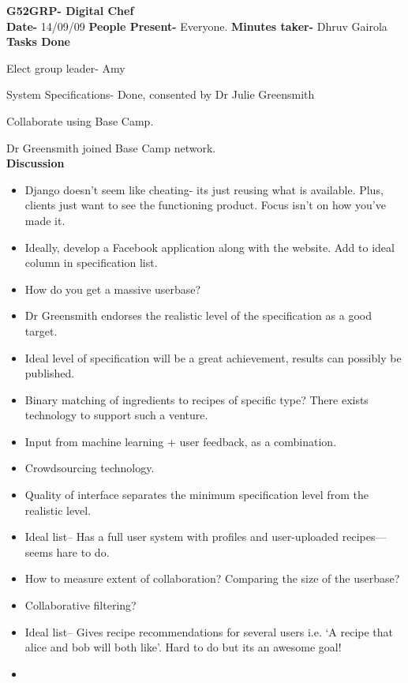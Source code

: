 \textbf{G52GRP- Digital Chef} \\

\textbf{Date-} 14/09/09 \textbf{People Present-} Everyone.
\textbf{Minutes taker-} Dhruv Gairola \\

\textbf{Tasks Done}

Elect group leader- Amy

System Specifications- Done, consented by Dr Julie Greensmith

Collaborate using Base Camp.

Dr Greensmith joined Base Camp network. \\

\textbf{Discussion}

\begin{itemize}
\item
  Django doesn’t seem like cheating- its just reusing what is
  available. Plus, clients just want to see the functioning product.
  Focus isn’t on how you’ve made it.
\item
  Ideally, develop a Facebook application along with the website. Add
  to ideal column in specification list.
\item
  How do you get a massive userbase?
\item
  Dr Greensmith endorses the realistic level of the specification as
  a good target.
\item
  Ideal level of specification will be a great achievement, results
  can possibly be published.
\item
  Binary matching of ingredients to recipes of specific type? There
  exists technology to support such a venture.
\item
  Input from machine learning + user feedback, as a combination.
\item
  Crowdsourcing technology.
\item
  Quality of interface separates the minimum specification level from
  the realistic level.
\item
  Ideal list-- Has a full user system with profiles and user-uploaded
  recipes—seems hare to do.
\item
  How to measure extent of collaboration? Comparing the size of the
  userbase?
\item
  Collaborative filtering?
\item
  Ideal list-- Gives recipe recommendations for several users i.e. ‘A
  recipe that alice and bob will both like’. Hard to do but its an
  awesome goal!
\item

\end{itemize}
